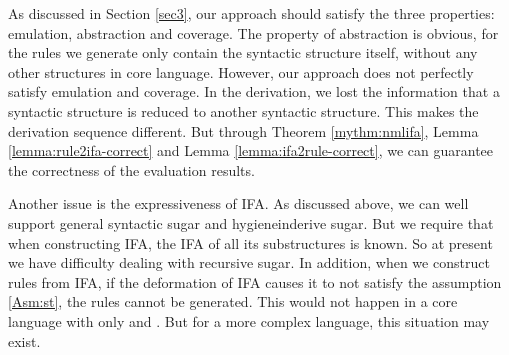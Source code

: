 
As discussed in Section \ref{sec3}, our approach should satisfy the three properties: emulation, abstraction and coverage. The property of abstraction is obvious, for the rules we generate only contain the syntactic structure itself, without any other structures in core language. However, our approach does not perfectly satisfy emulation and coverage. In the derivation, we lost the information that a syntactic structure is reduced to another syntactic structure. This makes the derivation sequence different. But through Theorem \ref{mythm:nmlifa}, Lemma \ref{lemma:rule2ifa-correct} and Lemma \ref{lemma:ifa2rule-correct}, we can guarantee the correctness of the evaluation results.

Another issue is the expressiveness of IFA. As discussed above, we can well support general syntactic sugar and hygieneinderive sugar. But we require that when constructing IFA, the IFA of all its substructures is known. So at present we have difficulty dealing with recursive sugar. In addition, when we construct rules from IFA, if the deformation of IFA causes it to not satisfy the assumption \ref{Asm:st}, the rules cannot be generated. This would not happen in a core language with only  and . But for a more complex language, this situation may exist.
